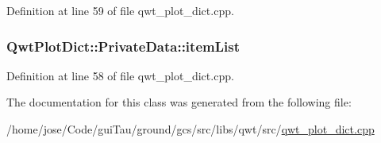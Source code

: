Definition at line 59 of file qwt\-\_\-plot\-\_\-dict.\-cpp.

\hypertarget{class_qwt_plot_dict_1_1_private_data_a5a5ae90ad0617a13bf1f523bb967fa31}{
\subsubsection[{item\-List}]{ Qwt\-Plot\-Dict\-::\-Private\-Data\-::item\-List}}\label{class_qwt_plot_dict_1_1_private_data_a5a5ae90ad0617a13bf1f523bb967fa31}


Definition at line 58 of file qwt\-\_\-plot\-\_\-dict.\-cpp.



The documentation for this class was generated from the following file\-:\begin{DoxyCompactItemize}
\item 
/home/jose/\-Code/gui\-Tau/ground/gcs/src/libs/qwt/src/\hyperlink{qwt__plot__dict_8cpp}{qwt\-\_\-plot\-\_\-dict.\-cpp}\end{DoxyCompactItemize}

